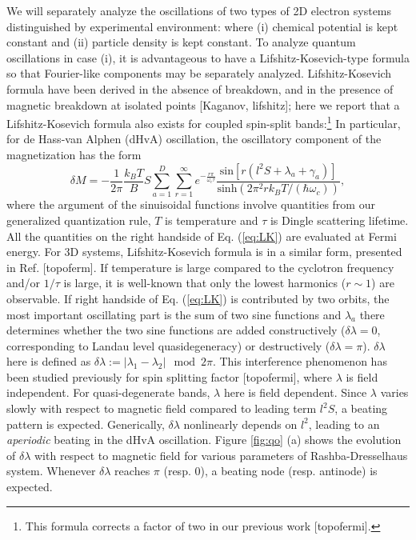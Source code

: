 \documentclass[aps, prb, showpacs, twocolumn, notitlepage, superscriptaddress]{revtex4-1}
\begin{document}

We will separately analyze the oscillations of two types of 2D electron systems distinguished by experimental environment: where (i) chemical potential is kept constant and (ii) particle density is kept constant. To analyze quantum oscillations in case (i), it is advantageous to have a Lifshitz-Kosevich-type formula so that Fourier-like components may be separately analyzed. Lifshitz-Kosevich formula have been derived in the absence of breakdown, and in the presence of magnetic breakdown at isolated points [Kaganov, lifshitz]; here we report that a Lifshitz-Kosevich formula also exists for coupled spin-split bands:\footnote{This formula corrects a factor of two in our previous work [topofermi].} In particular, for de Hass-van Alphen (dHvA) oscillation, the oscillatory component of the magnetization has the form
\begin{equation}
\delta M=-\frac{1}{2\pi}\frac{k_BT}{B}S\sum_{a=1}^D\sum_{r=1}^{\infty}e^{-\frac{r\pi}{\omega_c\tau}}\frac{\text{sin}[r(l^2S+\lambda_a+\gamma_a)]}{\text{sinh}(2\pi^2rk_BT/(\hbar\omega_c))},\label{eq:LK}
\end{equation}
where the argument of the sinuisoidal functions involve quantities from our generalized quantization rule, $T$ is temperature and $\tau$ is Dingle scattering lifetime. All the quantities on the right handside of Eq. (\ref{eq:LK}) are evaluated at Fermi energy. For 3D systems, Lifshitz-Kosevich formula is in a similar form, presented in Ref. [topoferm]. If temperature is large compared to the cyclotron frequency and/or $1/\tau$ is large, it is well-known that only the lowest harmonics ($r\sim 1$) are observable. If right handside of Eq. (\ref{eq:LK}) is contributed by two orbits, the most important oscillating part is the sum of two sine functions and $\lambda_a$ there determines whether the two sine functions are added constructively ($\delta \lambda=0$, corresponding to Landau level quasidegeneracy) or destructively ($\delta\lambda=\pi$). $\delta\lambda$ here is defined as $\delta\lambda:=|\lambda_1-\lambda_2| \mod 2\pi$. This interference phenomenon has been studied previously for spin splitting factor [topofermi], where $\lambda$ is field independent. For quasi-degenerate bands, $\lambda$ here is field dependent. Since $\lambda$ varies slowly with respect to magnetic field compared to leading term $l^2S$, a beating pattern is expected. Generically, $\delta \lambda$ nonlinearly depends on $l^2$, leading to an \textit{aperiodic} beating in the dHvA oscillation. Figure \ref{fig:qo} (a) shows the evolution of $\delta\lambda$ with respect to magnetic field for various parameters of Rashba-Dresselhaus system. Whenever $\delta\lambda$ reaches $\pi$ (resp. $0$), a beating node (resp. antinode) is expected. 
\end{document}
